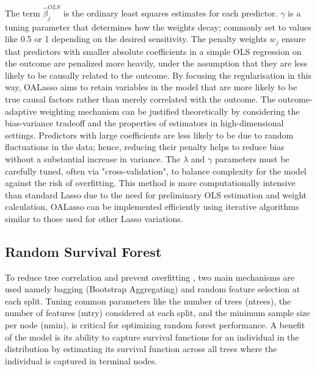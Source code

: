 \noindent The term \(\hat{\beta}_{j}^{OLS}\) is the ordinary least squares estimates for each predictor. \(\gamma\) is a tuning parameter that determines how the weights decay; commonly set to values like 0.5 or 1 depending on the desired sensitivity. The penalty weights \(w_{j}\) ensure that predictors with smaller absolute coefficients in a simple OLS regression on the outcome are penalized more heavily, under the assumption that they are less likely to be causally related to the outcome. By focusing the regularisation in this way, \parencite{shortreed_outcome-adaptive_2017} OALasso aims to retain variables in the model that are more likely to be true causal factors rather than merely correlated with the outcome. The outcome-adaptive weighting mechanism can be justified theoretically by considering the bias-variance tradeoff and the properties of estimators in high-dimensional settings. Predictors with large coefficients are less likely to be due to random fluctuations in the data; hence, reducing their penalty helps to reduce bias without a substantial increase in variance. The \(\lambda\) and \(\gamma\) parameters must be carefully tuned, often via "cross-validation", to balance complexity for the model against the risk of overfitting. This method is more computationally intensive than standard Lasso due to the need for preliminary OLS estimation and weight calculation, OALasso can be implemented efficiently using iterative algorithms \parencite{shortreed_outcome-adaptive_2017} similar to those used for other Lasso variations.

\subsection{Random Survival Forest}
\noindent To reduce tree correlation and prevent overfitting \parencite{pham_springer_2023}, two main mechanisms are used namely bagging (Bootstrap Aggregating) and random feature selection at each split. Tuning common parameters like the number of trees (ntrees), the number of features (mtry) considered at each split, and the minimum sample size per node (nmin), is critical for optimizing random forest performance. A benefit of the model is its ability to capture survival functions for an individual in the distribution by estimating its survival function across all trees where the individual is captured in terminal nodes. 

